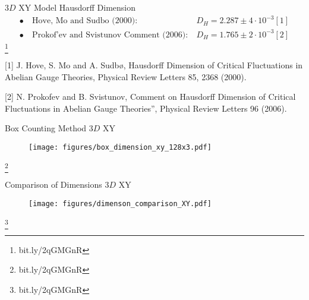 \documentclass[10pt]{beamer}
\newcommand\blfootnote[1]{%
  \begingroup
  \renewcommand\thefootnote{}\footnote{#1}%
  \addtocounter{footnote}{-1}%
  \endgroup
}
\begin{document}
\begin{frame}{$3D$ XY Model Hausdorff Dimension}
    \begin{align*}
        \bullet \ &\text{Hove, Mo and Sudbo (2000):}\ &D_H = 2.287 \pm 4 \cdot 10^{-3} [1] \\
        \bullet \ &\text{Prokof'ev and Svistunov Comment (2006):} \ &D_H = 1.765 \pm 2 \cdot 10^{-3} [2]
    \end{align*}
    \blfootnote{bit.ly/2qGMGnR}
        

\footnotesize [1] J. Hove, S. Mo and A. Sudbø, Hausdorff Dimension of Critical Fluctuations in Abelian Gauge Theories, Physical Review Letters 85, 2368 (2000).

\footnotesize [2] N. Prokofev and B. Svistunov, Comment on Hausdorff Dimension of Critical Fluctuations in Abelian Gauge Theories”, Physical Review Letters 96 (2006).

\end{frame}

\begin{frame}{Box Counting Method $3D$ XY}
    \begin{figure}[h!]
        \centering
            \texttt{[image: figures/box\_dimension\_xy\_128x3.pdf]}
    \end{figure}
    \blfootnote{bit.ly/2qGMGnR}
\end{frame}

\begin{frame}{Comparison of Dimensions $3D$ XY}
    \begin{figure}[h!]
        \centering
            \texttt{[image: figures/dimenson\_comparison\_XY.pdf]}
    \end{figure}
    \blfootnote{bit.ly/2qGMGnR}
\end{frame}
\end{document}
